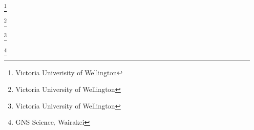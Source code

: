 \author{Chet Hopp}\footnote{Victoria Univerisity of Wellington}
\author{Martha Savage}\footnote{Victoria University of Wellington}
\author{John Townend}\footnote{Victoria University of Wellington}
\author{Steve Sherburn}\footnote{GNS Science, Wairakei}